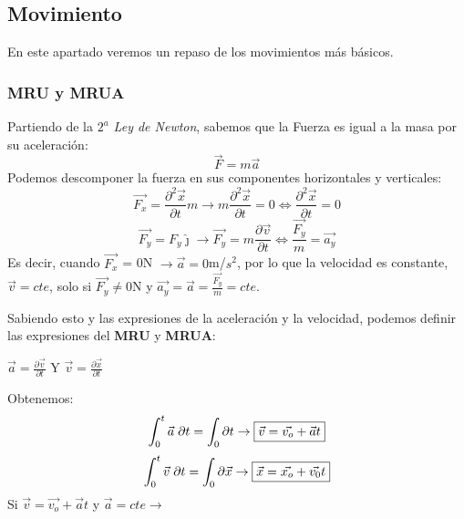 
\subsection{Movimiento}
En este apartado veremos un repaso de los movimientos más básicos.


\subsubsection{MRU y MRUA}

Partiendo de la \textit{\(2^a\) Ley de Newton}, sabemos que la Fuerza es igual a la masa por su aceleración:
\[\vec{F} = m\vec{a}\]
Podemos descomponer la fuerza en sus componentes horizontales y verticales:
\[
        \vec{F_{x}}=\frac{\partial^{2}\vec{x}}{\partial{t}}m
        \to
        m\frac{\partial^2 \vec{x}}{\partial t} = 0
        \Leftrightarrow
        \frac{\partial^2{\vec{x}}}{\partial{t}} = 0
\]
\[
        \vec{F_{y}}=F_{y}\hat{\jmath}
        \to
        \vec{F_y} = m\frac{\partial\vec{v}}{\partial t}\Leftrightarrow
        \frac{\vec{F_y}}{m} = \vec{a_y}
\]
Es decir, cuando \(\vec{F_x}\) = 0N \(\to\vec{a}=0\)m/\(s^2\), por lo que la velocidad es constante, \(\vec{v}=cte\), solo si \(\vec{F_y}\neq 0\)N y \(\vec{a_y} = \vec{a} = \frac{\vec{F_y}}{m}=cte\).\par \vspace{0.5cm} Sabiendo esto y las expresiones de la aceleración y la velocidad, podemos definir las expresiones del \textbf{MRU} y \textbf{MRUA}: \par \vspace{0.5cm} \hspace{5cm}
\( \vec{a} = \frac{\partial \vec{v} }{\partial t}\) Y \( \vec{v} = \frac{\partial \vec{x} }{\partial t}\) \par \vspace{0.5cm} Obtenemos:
\[
        \int_{0}^{t}{\vec{a}\hspace{1mm}\partial{t}} = \int_{0}\partial{t}
        \to
        \boxed{\vec{v} = \vec{v_o} + \vec{a}t}
\]
\[
        \int_{0}^{t}{\vec{v}\hspace{1mm}\partial{t}} = \int_{0}{\partial{\vec{x}}}
        \to
        \boxed{\vec{x} = \vec{x_o} + \vec{v_0}t}
\]
\hspace{2.3cm} Si \( \vec{v} = \vec{v_o} + \vec{a}t\)
y
\( \vec{a} = cte \to\) 
